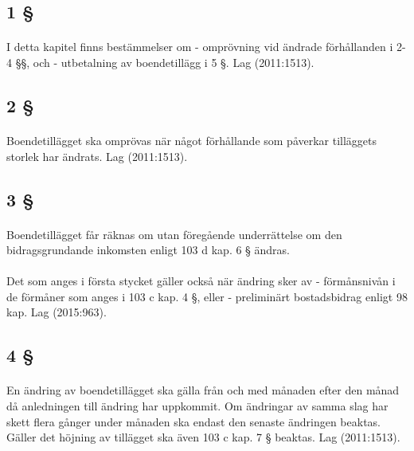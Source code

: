 \documentclass[a4paper,notitlepage,openany,10pt]{book}
\begin{document}
\subsection*{1 §}
\paragraph*{}
I detta kapitel finns bestämmelser om
\newline - omprövning vid ändrade förhållanden i 2-4 §§, och
\newline - utbetalning av boendetillägg i 5 §.
Lag (2011:1513).
\subsection*{2 §}
\paragraph*{}
Boendetillägget ska omprövas när något förhållande som påverkar tilläggets storlek har ändrats.
Lag (2011:1513).
\subsection*{3 §}
\paragraph*{}
Boendetillägget får räknas om utan föregående underrättelse om den bidragsgrundande inkomsten enligt 103 d kap. 6 § ändras.
\paragraph*{}
Det som anges i första stycket gäller också när ändring sker av
\newline - förmånsnivån i de förmåner som anges i 103 c kap. 4 §, eller
\newline - preliminärt bostadsbidrag enligt 98 kap.
Lag (2015:963).
\subsection*{4 §}
\paragraph*{}
En ändring av boendetillägget ska gälla från och med månaden efter den månad då anledningen till ändring har uppkommit. Om ändringar av samma slag har skett flera gånger under månaden ska endast den senaste ändringen beaktas. Gäller det höjning av tillägget ska även 103 c kap. 7 § beaktas.
Lag (2011:1513).
\end{document}

